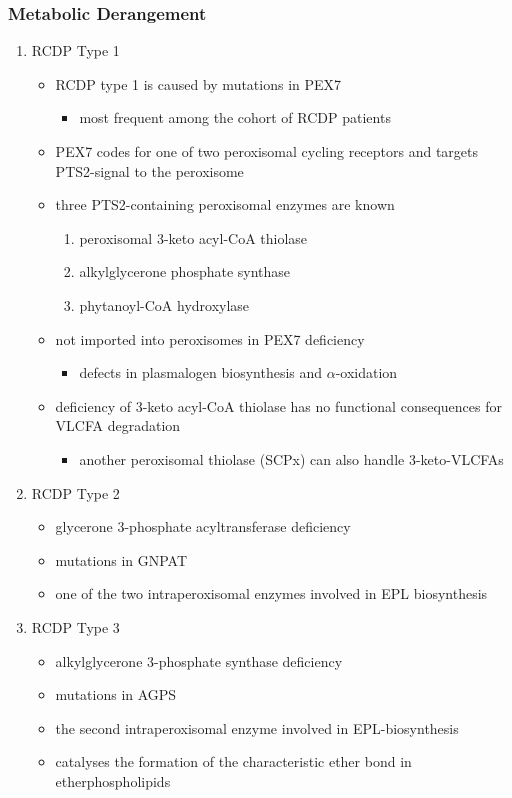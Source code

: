 \documentclass[12pt]{scrartcl}
\begin{document}
\subsubsection{Metabolic Derangement}
\label{sec:orgca08084}
\begin{enumerate}
\item RCDP Type 1
\label{sec:org1f4288a}
\begin{itemize}
\item RCDP type 1 is caused by mutations in PEX7
\begin{itemize}
\item most frequent among the cohort of RCDP patients
\end{itemize}
\item PEX7 codes for one of two peroxisomal cycling receptors and targets
PTS2-signal to the peroxisome
\item three PTS2-containing peroxisomal enzymes are known 
\begin{enumerate}
\item peroxisomal 3-keto acyl-CoA thiolase
\item alkylglycerone phosphate synthase
\item phytanoyl-CoA hydroxylase
\end{enumerate}
\item not imported into peroxisomes in PEX7 deficiency
\begin{itemize}
\item defects in plasmalogen biosynthesis and \(\alpha\)-oxidation
\end{itemize}
\item deficiency of 3-keto acyl-CoA thiolase has no functional
consequences for VLCFA degradation
\begin{itemize}
\item another peroxisomal thiolase (SCPx) can also handle 3-keto-VLCFAs
\end{itemize}
\end{itemize}

\item RCDP Type 2
\label{sec:orgb83e36e}
\begin{itemize}
\item glycerone 3-phosphate acyltransferase deficiency
\item mutations in GNPAT
\item one of the two intraperoxisomal enzymes involved in EPL biosynthesis
\end{itemize}

\item RCDP Type 3
\label{sec:org09dc68b}
\begin{itemize}
\item alkylglycerone 3-phosphate synthase deficiency
\item mutations in AGPS
\item the second intraperoxisomal enzyme involved in EPL-biosynthesis
\item catalyses the formation of the characteristic ether bond in etherphospholipids
\end{itemize}
\end{enumerate}
\end{document}
